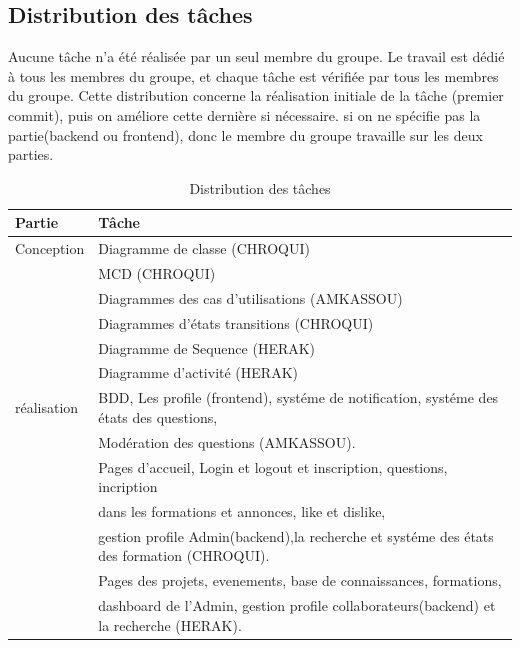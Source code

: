 \documentclass{article}
\begin{document}
        \subsection{Distribution des tâches}
            Aucune tâche n'a été réalisée par un seul membre du groupe. Le travail est dédié à tous les membres du groupe, 
            et chaque tâche est vérifiée par tous les membres du groupe.
            Cette distribution concerne la réalisation initiale de la tâche (premier commit), puis on améliore cette dernière si nécessaire.\newline
            si on ne spécifie pas la partie(backend ou frontend), donc le membre du groupe travaille sur les deux parties.\newline
            \begin{table}[h!]
                \centering
                \begin{tabular}{|l|l|}
                    \hline
                    Partie &
                    Tâche \\
                    \hline
                    Conception  &
                    Diagramme de classe (CHROQUI) \\
                                &
                    MCD (CHROQUI) \\
                                &
                    Diagrammes des cas d'utilisations (AMKASSOU) \\
                                &
                    Diagrammes d'états transitions (CHROQUI) \\
                                &
                    Diagramme de Sequence (HERAK) \\
                                &
                    Diagramme d'activité (HERAK) \\
                    \hline
                    réalisation &
                    BDD, Les profile (frontend), systéme de notification, systéme des états des questions,\\
                                &
                    Modération des questions (AMKASSOU). \\
                                &
                    Pages d'accueil, Login et logout et inscription, questions, incription\\
                                &
                    dans les formations et annonces, like et dislike,\\
                                &
                    gestion profile Admin(backend),la recherche et systéme des états des formation (CHROQUI). \\
                                &
                    Pages des projets, evenements, base de connaissances, formations,\\
                                &
                    dashboard de l'Admin, gestion profile collaborateurs(backend) et la recherche (HERAK). \\
                    \hline
                \end{tabular}
                \caption{Distribution des tâches}
            \end{table}
            \FloatBarrier
\end{document}
